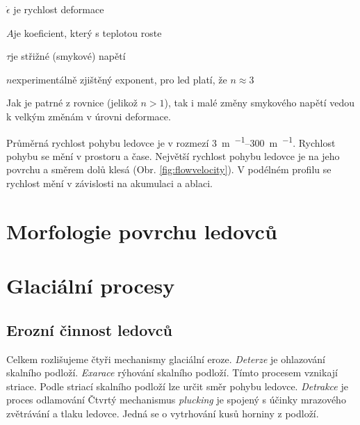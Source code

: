 \begin{eqexpl}
	\item{$\dot{\epsilon}$} je rychlost deformace
	\item{$A$}je koeficient, který s teplotou roste
	\item{$\tau$}je střižné (smykové) napětí 
	\item{$n$}experimentálně zjištěný exponent, pro led platí, že $n \approx 3$
\end{eqexpl}

Jak je patrné z rovnice (jelikož $n > 1$), tak i malé změny smykového napětí  vedou k velkým změnám v úrovni deformace.

Průměrná rychlost pohybu ledovce je v rozmezí \SIrange{3}{300}{\metre\per\rok}. Rychlost pohybu se mění v prostoru a čase. Největší rychlost pohybu ledovce je na jeho povrchu a směrem dolů klesá (Obr. \ref{fig:flowvelocity}). V podélném profilu se rychlost mění v závislosti na akumulaci a ablaci.

\section{Morfologie povrchu ledovců}

\section{Glaciální procesy}

\subsection{Erozní činnost ledovců}
Celkem rozlišujeme čtyři mechanismy glaciální eroze. \emph{Deterze} je ohlazování skalního podloží. \emph{Exarace} rýhování skalního podloží. Tímto procesem vznikají striace. Podle striací skalního podloží lze určit směr pohybu ledovce. \emph{Detrakce} je proces odlamování Čtvrtý mechanismus \emph{plucking} je spojený s účinky mrazového zvětrávání a tlaku ledovce. Jedná se o vytrhování kusů horniny z podloží.

